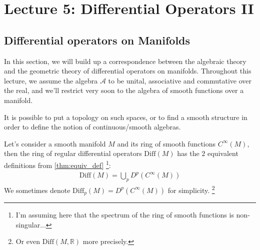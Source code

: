 % 
\newpage
{}
\section{Lecture 5: Differential Operators II} %
\label{sec:lecture_5_differential_operators_ii}
% 
\subsection{Differential operators on Manifolds} %
\label{sub:differential_operators_on_manifolds}
In this section, we will build up a correspondence between the algebraic theory and the geometric theory of differential operators on manifolds.
Throughout this lecture, we assume the algebra $\mathcal{A}$ to be unital, associative and commutative over the real, and we'll restrict very soon to the algebra of smooth functions over a manifold.

    It is possible to put a topology on such spaces, or to find a smooth structure in order to define the notion of continuous/smooth algebras.

Let's consider a smooth manifold $M$ and its ring of smooth functions $C^\infty(M)$, then the ring of regular differential operators $\mathrm{Diff}(M)$ has the $2$ equivalent definitions from \cref{thm:equiv_def} 
\footnote{
    I'm assuming here that the spectrum of the ring of smooth functions is non-singular...    
}:
\begin{align}
    \mathrm{Diff}(M) = \bigcup_p D^p(C^\infty(M))
\end{align}
We sometimes denote $\mathrm{Diff}_p(M) = D^p(C^\infty(M))$ for simplicity.
\footnote{
    Or even $\mathrm{Diff}(M, \mathbb{R})$ more precisely.
}
% 

